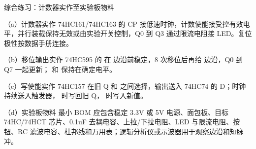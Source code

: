 \begin{chapteranswer}{综合练习：计数器实作至实验板物料}
\begin{answersubproblem}{（a）计数器实作}
74HC161/74HC163 的 CP 接低速时钟，计数使能接受控有效电平，并行装载保持无效或由实验开关控制，Q0 到 Q3 通过限流电阻接 LED。复位极性按数据手册连接。
\end{answersubproblem}
\begin{answersubproblem}{（b）移位输出实作}
74HC595 的  在  边沿前稳定，8 次移位后再给  边沿，Q0 到 Q7 一起更新； 和  保持在确定电平。
\end{answersubproblem}
\begin{answersubproblem}{（c）写使能实作}
74HC157 在旧 Q 和  之间选择，输出送入 74HC74 的 D；时钟持续送入触发器， 时写回旧 Q， 时写入新值。
\end{answersubproblem}
\begin{answersubproblem}{（d）实验板物料}
最小 BOM 应包含稳定 3.3V 或 5V 电源、面包板、目标 74HC/74HCT 芯片、0.1uF 去耦电容、上拉/下拉电阻、LED 与限流电阻、按钮、RC 滤波电容、杜邦线和万用表；逻辑分析仪或示波器用于观察边沿和短脉冲。
\end{answersubproblem}
\end{chapteranswer}

